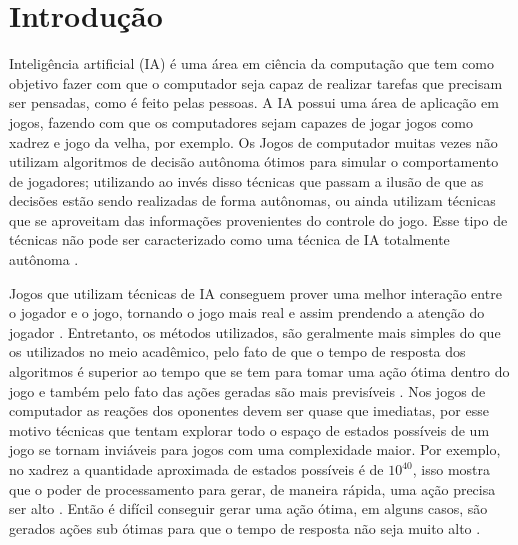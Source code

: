 \chapter{\label{chap:intro}Introdução}

Inteligência artificial (IA) é uma área em ciência da computação que tem como objetivo fazer com que o computador seja capaz de realizar tarefas que precisam ser pensadas, como é feito pelas pessoas. A IA possui uma área de aplicação em jogos, fazendo com que os computadores sejam capazes de jogar jogos como xadrez e jogo da velha, por exemplo. 
Os Jogos de computador muitas vezes não utilizam algoritmos de decisão autônoma ótimos para simular o comportamento de jogadores; utilizando ao invés disso técnicas que passam a ilusão de que as decisões estão sendo realizadas de forma autônomas, ou ainda utilizam técnicas que se aproveitam das informações provenientes do controle do jogo. Esse tipo de técnicas não pode ser caracterizado como uma técnica de IA totalmente autônoma \cite{millington2009artificial}.


Jogos que utilizam técnicas de IA conseguem prover uma melhor interação entre o jogador e o jogo, tornando o jogo mais real e assim prendendo a atenção do jogador \cite{millington2009artificial}.
Entretanto, os métodos utilizados, são geralmente mais simples do que os utilizados no meio acadêmico, pelo fato de que o tempo de resposta dos algoritmos é superior ao tempo que se tem para tomar uma ação ótima dentro do jogo e também pelo fato das ações geradas são mais previsíveis \cite{intelligence2003modern}.
Nos jogos de computador as reações dos oponentes devem ser quase que imediatas, por esse motivo técnicas que tentam explorar todo o espaço de estados possíveis de um jogo se tornam inviáveis para jogos com uma complexidade maior.
Por exemplo, no xadrez a quantidade aproximada de estados possíveis é de $10^{40}$, isso mostra que o poder de processamento para gerar, de maneira rápida, uma ação precisa ser alto \cite{millington2009artificial}. 
Então é difícil conseguir gerar uma ação ótima, em alguns casos, são gerados ações sub ótimas para que o tempo de resposta não seja muito alto \cite{intelligence2003modern}. 


